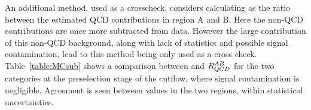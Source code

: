 
An additional method, used as a crosscheck, considers calculating \rqcd as the ratio between the estimated QCD contributions in region A 
and B. Here the non-QCD contributions are once more subtracted from data. However the large contribution of this non-QCD background, 
along with lack of statistics and possible signal contamination, lead to this method being only used as a cross check. Table~\ref{table:MCsub} shows 
a comparison between \rqcd and $R_{QCD}^{AB}$ for the two categories at the preselection stage of the cutflow, where signal contamination is negligible. 
Agreement is seen between \rqcd values in the two regions, within statistical uncertainties. 


